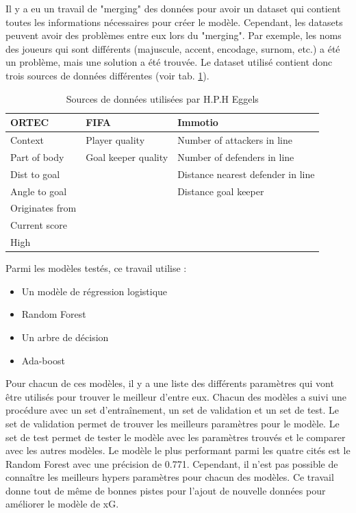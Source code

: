\documentclass[12pt]{article}
\begin{document}
Il y a eu un travail de "merging" des données pour avoir un dataset qui contient toutes les informations nécessaires pour créer le modèle. 
Cependant, les datasets peuvent avoir des problèmes entre eux lors du "merging". 
Par exemple, les noms des joueurs qui sont différents (majuscule, accent, encodage, surnom, etc.) a été un problème, mais une solution a été trouvée.
\newline
Le dataset utilisé contient donc trois sources de données différentes (voir tab. \ref{tab:data_from_eggels}).
\begin{table}[htp]
    \centering
    \begin{tabular}{lll}
    \hline
    \textbf{ORTEC}  & \textbf{FIFA}       & \textbf{Immotio}                  \\ \hline
    Context         & Player quality      & Number of attackers in line       \\
    Part of body    & Goal keeper quality & Number of defenders in line       \\
    Dist to goal    &                     & Distance nearest defender in line \\
    Angle to goal   &                     & Distance goal keeper              \\
    Originates from &                     &                                   \\
    Current score   &                     &                                   \\
    High            &                     &                                   \\ \hline
    \end{tabular}
    \caption{Sources de données utilisées par H.P.H Eggels}
    \label{tab:data_from_eggels}
\end{table}
\newpage
Parmi les modèles testés, ce travail utilise :
\begin{itemize}
    \item Un modèle de régression logistique
    \item Random Forest
    \item Un arbre de décision
    \item Ada-boost
\end{itemize}
Pour chacun de ces modèles, il y a une liste des différents paramètres qui vont être utilisés pour trouver le meilleur d'entre eux.
Chacun des modèles a suivi une procédure avec un set d'entraînement, un set de validation et un set de test.
Le set de validation permet de trouver les meilleurs paramètres pour le modèle.
Le set de test permet de tester le modèle avec les paramètres trouvés et le comparer avec les autres modèles.
Le modèle le plus performant parmi les quatre cités est le Random Forest avec une précision de 0.771.
Cependant, il n'est pas possible de connaître les meilleurs hypers paramètres pour chacun des modèles.
Ce travail donne tout de même de bonnes pistes pour l'ajout de nouvelle données pour améliorer le modèle de xG.
\newpage
\end{document}
